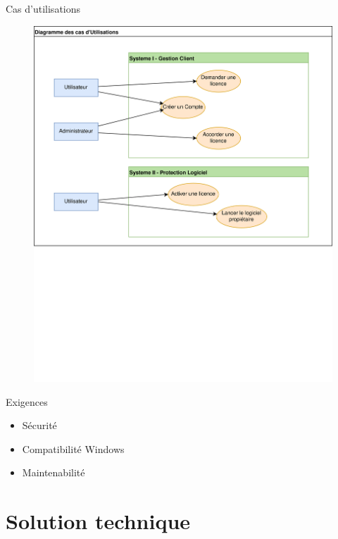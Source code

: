 \documentclass{cubeamer}
\begin{document}
\begin{frame}{Cas d'utilisations}
    \begin{figure}
        \centering
        \includegraphics[scale=0.5]{img/Util.png}
    \end{figure}
\end{frame}

\begin{frame}{Exigences}
    \begin{itemize}
        \item Sécurité
        \medskip
        \item Compatibilité Windows
        \medskip
        \item Maintenabilité
    \end{itemize}
\end{frame}

\section{Solution technique}
\end{document}
